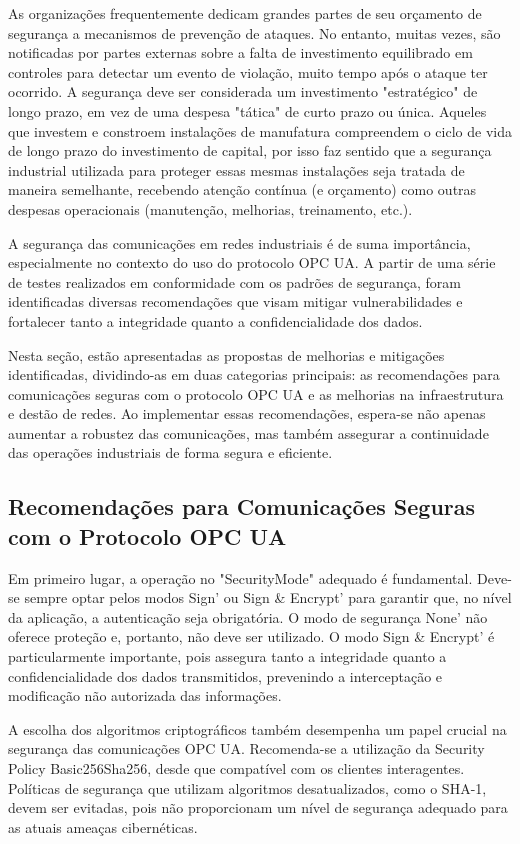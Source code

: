 As organizações frequentemente dedicam grandes partes de seu orçamento de segurança a mecanismos de prevenção de ataques. No entanto, muitas vezes, são notificadas por partes externas sobre a falta de investimento equilibrado em controles para detectar um evento de violação, muito tempo após o ataque ter ocorrido. A segurança deve ser considerada um investimento "estratégico" de longo prazo, em vez de uma despesa "tática" de curto prazo ou única. Aqueles que investem e constroem instalações de manufatura compreendem o ciclo de vida de longo prazo do investimento de capital, por isso faz sentido que a segurança industrial utilizada para proteger essas mesmas instalações seja tratada de maneira semelhante, recebendo atenção contínua (e orçamento) como outras despesas operacionais (manutenção, melhorias, treinamento, etc.).

A segurança das comunicações em redes industriais é de suma importância, especialmente no contexto do uso do protocolo OPC UA. A partir de uma série de testes realizados em conformidade com os padrões de segurança, foram identificadas diversas recomendações que visam mitigar vulnerabilidades e fortalecer tanto a integridade quanto a confidencialidade dos dados.

Nesta seção, estão apresentadas as propostas de melhorias e mitigações identificadas, dividindo-as em duas categorias principais: as recomendações para comunicações seguras com o protocolo OPC UA e as melhorias na infraestrutura e destão de redes. Ao implementar essas recomendações, espera-se não apenas aumentar a robustez das comunicações, mas também assegurar a continuidade das operações industriais de forma segura e eficiente.

\subsection{Recomendações para Comunicações Seguras com o Protocolo OPC UA}

Em primeiro lugar, a operação no "SecurityMode" adequado é fundamental. Deve-se sempre optar pelos modos Sign' ou Sign & Encrypt' para garantir que, no nível da aplicação, a autenticação seja obrigatória. O modo de segurança None' não oferece proteção e, portanto, não deve ser utilizado. O modo Sign & Encrypt' é particularmente importante, pois assegura tanto a integridade quanto a confidencialidade dos dados transmitidos, prevenindo a interceptação e modificação não autorizada das informações.

A escolha dos algoritmos criptográficos também desempenha um papel crucial na segurança das comunicações OPC UA. Recomenda-se a utilização da Security Policy Basic256Sha256, desde que compatível com os clientes interagentes. Políticas de segurança que utilizam algoritmos desatualizados, como o SHA-1, devem ser evitadas, pois não proporcionam um nível de segurança adequado para as atuais ameaças cibernéticas.

